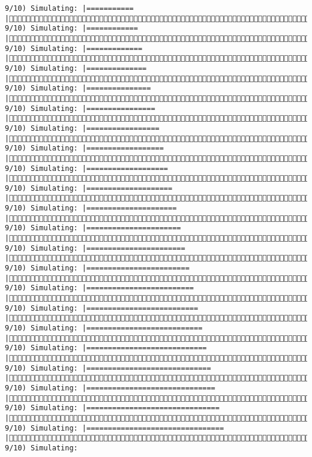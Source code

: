 \documentclass[]{article}
\begin{document}
\begin{verbatim}
9/10) Simulating: |===========                                          |( 9/10) Simulating: |============                                         |( 9/10) Simulating: |=============                                        |( 9/10) Simulating: |==============                                       |( 9/10) Simulating: |===============                                      |( 9/10) Simulating: |================                                     |( 9/10) Simulating: |=================                                    |( 9/10) Simulating: |==================                                   |( 9/10) Simulating: |===================                                  |( 9/10) Simulating: |====================                                 |( 9/10) Simulating: |=====================                                |( 9/10) Simulating: |======================                               |( 9/10) Simulating: |=======================                              |( 9/10) Simulating: |========================                             |( 9/10) Simulating: |=========================                            |( 9/10) Simulating: |==========================                           |( 9/10) Simulating: |===========================                          |( 9/10) Simulating: |============================                         |( 9/10) Simulating: |=============================                        |( 9/10) Simulating: |==============================                       |( 9/10) Simulating: |===============================                      |( 9/10) Simulating: |================================                     |( 9/10) Simulating: 
\end{verbatim}
\end{document}
